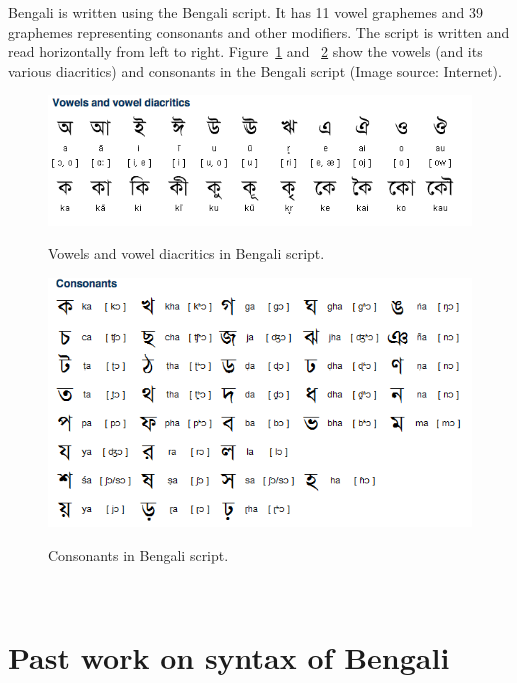 \documentclass[11pt,letterpaper]{article}
\begin{document}
%
\noindent Bengali is written using the Bengali script. It has 11 vowel graphemes and 39 graphemes representing consonants and other modifiers. The script is written and read horizontally from left to right. Figure~\ref{vowels} and ~\ref{cons} show the vowels (and its  various diacritics) and consonants in the Bengali script (Image source: Internet).
\graphicspath{ {images/} }
\begin{figure}[h]
  \caption{Vowels and vowel diacritics in Bengali script.}
  \centering
  \includegraphics[scale=0.35]{vowels}
  \label{vowels}
\end{figure}
\begin{figure}[h]
  \caption{Consonants in Bengali script.}
  \centering
  \includegraphics[scale=0.35]{consonants}
  \label{cons}
\end{figure} \\

\section{Past work on syntax of Bengali}
\end{document}
